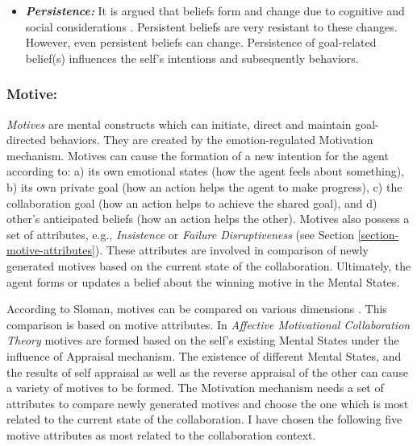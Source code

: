 \documentclass[letterpaper]{article}
\begin{document}
\begin{itemize}
  \item \textbf{\textit{Persistence:}} It is argued that beliefs form and change
  due to cognitive and social considerations \cite{carley:belief-persistence}.
  Persistent beliefs are very resistant to these changes. However, even
  persistent beliefs can change. Persistence of goal-related belief(s)
  influences the self's intentions and subsequently behaviors.
\end{itemize}

\subsubsection{Motive:}

\textit{Motives} are mental constructs which can initiate, direct and maintain
goal-directed behaviors. They are created by the emotion-regulated Motivation
mechanism. Motives can cause the formation of a new intention for the agent
according to: a) its own emotional states (how the agent feels about something),
b) its own private goal (how an action helps the agent to make progress), c) the
collaboration goal (how an action helps to achieve the shared goal), and d)
other's anticipated beliefs (how an action helps the other). Motives also
possess a set of attributes, e.g., \textit{Insistence} or \textit{Failure
Disruptiveness} (see Section \ref{section-motive-attributes}). These attributes
are involved in comparison of newly generated motives based on the current state
of the collaboration. Ultimately, the agent forms or updates a belief about the
winning motive in the Mental States.

According to Sloman, motives can be compared on various dimensions
\cite{sloman:motivation}. This comparison is based on motive attributes. In
\textit{Affective Motivational Collaboration Theory} motives are formed based on
the self's existing Mental States under the influence of Appraisal mechanism. The
existence of different Mental States, and the results of self appraisal as
well as the reverse appraisal of the other can cause a variety of motives to be
formed. The Motivation mechanism needs a set of attributes to compare newly
generated motives and choose the one which is most related to the current state
of the collaboration. I have chosen the following five motive attributes as
most related to the collaboration context.
\end{document}
